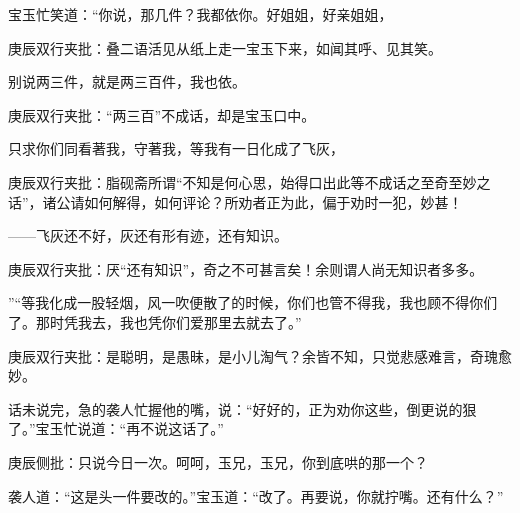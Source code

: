 \begin{parag}


    宝玉忙笑道：“你说，那几件？我都依你。好姐姐，好亲姐姐，\begin{note}庚辰双行夹批：叠二语活见从纸上走一宝玉下来，如闻其呼、见其笑。\end{note}别说两三件，就是两三百件，我也依。\begin{note}庚辰双行夹批：“两三百”不成话，却是宝玉口中。\end{note}只求你们同看著我，守著我，等我有一日化成了飞灰，\begin{note}庚辰双行夹批：脂砚斋所谓“不知是何心思，始得口出此等不成话之至奇至妙之话”，诸公请如何解得，如何评论？所劝者正为此，偏于劝时一犯，妙甚！\end{note}——飞灰还不好，灰还有形有迹，还有知识。\begin{note}庚辰双行夹批：厌“还有知识”，奇之不可甚言矣！余则谓人尚无知识者多多。\end{note}”“等我化成一股轻烟，风一吹便散了的时候，你们也管不得我，我也顾不得你们了。那时凭我去，我也凭你们爱那里去就去了。”\begin{note}庚辰双行夹批：是聪明，是愚昧，是小儿淘气？余皆不知，只觉悲感难言，奇瑰愈妙。\end{note}话未说完，急的袭人忙握他的嘴，说：“好好的，正为劝你这些，倒更说的狠了。”宝玉忙说道：“再不说这话了。”\begin{note}庚辰侧批：只说今日一次。呵呵，玉兄，玉兄，你到底哄的那一个？\end{note}袭人道：“这是头一件要改的。”宝玉道：“改了。再要说，你就拧嘴。还有什么？”
\end{parag}


